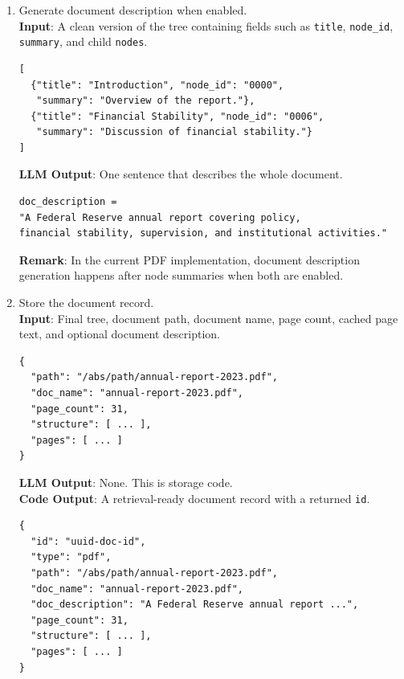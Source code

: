 \documentclass[11pt,a4paper]{article}
\newcommand{\fieldname}[1]{\textcolor{red!70!black}{\texttt{#1}}}
\begin{document}
\begin{enumerate}
\begin{enumerate}[label=(\alph*)]
        \item Generate document description when enabled. \\
        \textbf{Input}: A clean version of the tree containing fields such as \fieldname{title}, \fieldname{node\_id}, \fieldname{summary}, and child \fieldname{nodes}.
\begin{lstlisting}[style=pageTextBlockInList]
[
  {"title": "Introduction", "node_id": "0000",
   "summary": "Overview of the report."},
  {"title": "Financial Stability", "node_id": "0006",
   "summary": "Discussion of financial stability."}
]
\end{lstlisting}
        \textbf{LLM Output}: One sentence that describes the whole document.
\begin{lstlisting}[style=pageTextBlockInList]
doc_description =
"A Federal Reserve annual report covering policy,
financial stability, supervision, and institutional activities."
\end{lstlisting}
        \textbf{Remark}: In the current PDF implementation, document description generation happens after node summaries when both are enabled.

        \item Store the document record. \\
        \textbf{Input}: Final tree, document path, document name, page count, cached page text, and optional document description.
\begin{lstlisting}[style=pageTextBlockInList]
{
  "path": "/abs/path/annual-report-2023.pdf",
  "doc_name": "annual-report-2023.pdf",
  "page_count": 31,
  "structure": [ ... ],
  "pages": [ ... ]
}
\end{lstlisting}
        \textbf{LLM Output}: None. This is storage code. \\
        \textbf{Code Output}: A retrieval-ready document record with a returned \fieldname{id}.
\begin{lstlisting}[style=pageTextBlockInList]
{
  "id": "uuid-doc-id",
  "type": "pdf",
  "path": "/abs/path/annual-report-2023.pdf",
  "doc_name": "annual-report-2023.pdf",
  "doc_description": "A Federal Reserve annual report ...",
  "page_count": 31,
  "structure": [ ... ],
  "pages": [ ... ]
}
\end{lstlisting}
    \end{enumerate}
\end{enumerate}
\end{document}
